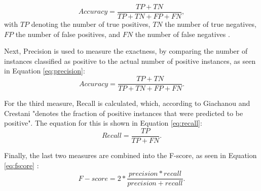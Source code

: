 \begin{equation}
    \label{eq:accuracy}
    Accuracy = \frac{TP + TN}{TP + TN + FP + FN},
\end{equation}
with $TP$ denoting the number of true positives, $TN$ the number of true negatives, $FP$ the number of false positives, and $FN$ the number of false negatives \cite{DBLP:journals/csur/GiachanouC16}. 

Next, Precision is used to measure the exactness, by comparing the number of instances classified as positive to the actual number of positive instances, as seen in Equation \eqref{eq:precision}:
\begin{equation}
    \label{eq:precision}
    Accuracy = \frac{TP + TN}{TP + TN + FP + FN}.
\end{equation}

For the third measure, Recall is calculated, which, according to Giachanou and Crestani "denotes the fraction of positive instances that were predicted to be positive". The equation for this is shown in Equation \eqref{eq:recall}:
\begin{equation}
    \label{eq:recall}
    Recall = \frac{TP}{TP + FN}.
\end{equation}

Finally, the last two measures are combined into the F-score, as seen in Equation \eqref{eq:fscore} \cite{DBLP:journals/csur/GiachanouC16}:
\begin{equation}
    \label{eq:fscore}
    F-score = 2*\frac{precision * recall}{precision + recall}.
\end{equation}


